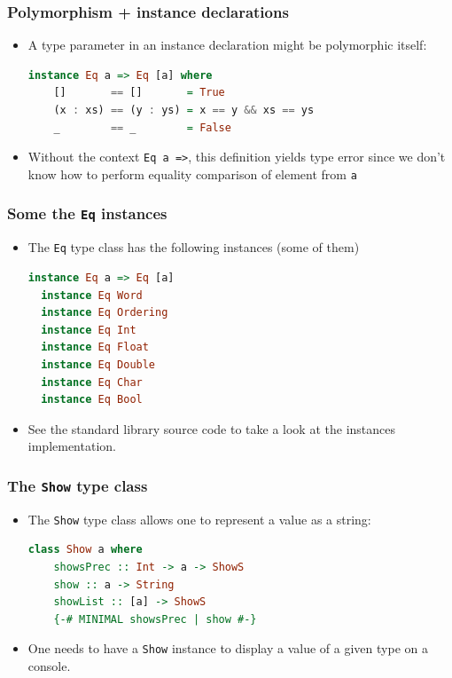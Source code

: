 \documentclass[10pt,pdf,utf8,russian,aspectratio=169]{beamer}
\begin{document}
\begin{frame}[fragile]
  \frametitle{Polymorphism + instance declarations}

\begin{itemize}
  \item A type parameter in an instance declaration might be polymorphic itself:

  \begin{lstlisting}[language=Haskell]
  instance Eq a => Eq [a] where
    []       == []       = True
    (x : xs) == (y : ys) = x == y && xs == ys
    _        == _        = False
  \end{lstlisting}
  \item Without the context \verb"Eq a =>", this definition yields type error since we don't know how to perform
  equality comparison of element from \verb"a"
\end{itemize}
\end{frame}

\begin{frame}[fragile]
  \frametitle{Some the \verb"Eq" instances}

\begin{itemize}
\item The \verb"Eq" type class has the following instances (some of them)

  \begin{lstlisting}[language=Haskell]
  instance Eq a => Eq [a]
  instance Eq Word
  instance Eq Ordering
  instance Eq Int
  instance Eq Float
  instance Eq Double
  instance Eq Char
  instance Eq Bool
  \end{lstlisting}
\item See the standard library source code to take a look at the instances implementation.
\end{itemize}
\end{frame}

\begin{frame}[fragile]
  \frametitle{The \verb"Show" type class}

\begin{itemize}
  \item The \verb"Show" type class allows one to represent a value as a string:
  \begin{lstlisting}[language=Haskell]
  class Show a where
    showsPrec :: Int -> a -> ShowS
    show :: a -> String
    showList :: [a] -> ShowS
    {-# MINIMAL showsPrec | show #-}
  \end{lstlisting}
  \item One needs to have a \verb"Show" instance to display a value of a given type on a console.
\end{itemize}
\end{frame}
\end{document}
